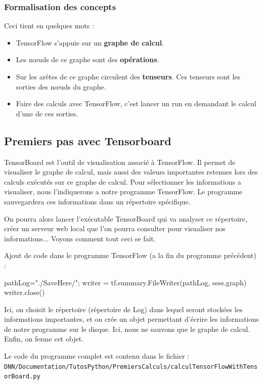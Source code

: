 \documentclass[a4paper,11pt]{book}
\begin{document}
\subsubsection{Formalisation des concepts}
Ceci tient en quelques mots :
\begin{itemize}
\item TensorFlow s'appuie sur un \textbf{graphe de calcul}.
\item Les nœuds de ce graphe sont des \textbf{opérations}.
\item Sur les arêtes de ce graphe circulent des \textbf{tenseurs}. Ces tenseurs sont les sorties des nœuds du graphe.
\item Faire des calculs avec TensorFlow, c'est lancer un run en demandant le calcul d'une de ces sorties.
\end{itemize}

\subsection{Premiers pas avec Tensorboard}

TensorBoard est l'outil de visualisation associé à TensorFlow. Il permet de visualiser le graphe de calcul, mais aussi des valeurs importantes retenues lors des calculs exécutés sur ce graphe de calcul.
Pour sélectionner les informations a visualiser, nous l'indiquerons a notre programme TensorFlow. Le programme sauvegardera ces informations dans un répertoire spécifique.

On pourra alors lancer l'exécutable TensorBoard qui va analyser ce répertoire, créer un serveur web local que l'on pourra consulter pour visualiser nos informations...
Voyons comment tout ceci se fait.


Ajout de code dans le programme TensorFlow (a la fin du programme précédent) :
\begin{mypython}
pathLog="./SaveHere/";
writer = tf.summary.FileWriter(pathLog, sess.graph)
writer.close()
\end{mypython}
Ici, on choisit le répertoire (répertoire de Log) dans lequel seront stockées les informations importantes, et on crée un objet permettant d'écrire les informations de notre programme sur le disque. Ici, nous ne sauvons que le graphe de calcul. Enfin, on ferme cet objet.

Le code du programme complet est contenu dans le fichier :\\
\verb+DNN/Documentation/TutosPython/PremiersCalculs/calculTensorFlowWithTensorBoard.py+
\end{document}
